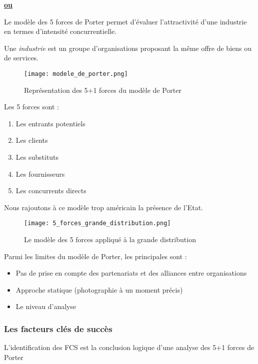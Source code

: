    \underline{{\textbf{ou}}}
   
   Le modèle des 5 forces de Porter permet d'évaluer l'attractivité d'une industrie en termes d'intensité concurrentielle.
   
   Une \textit{industrie} est un groupe d'organisations proposant la même offre de biens ou de services.
   
   \begin{figure}[H]
      \begin{center}
	\texttt{[image: modele\_de\_porter.png]}
	\caption{Représentation des 5+1 forces du modèle de Porter}
      \end{center}
   \end{figure}
   
   Les 5 forces sont :
   
   \begin{enumerate}
    \item Les entrants potentiels
    \item Les clients
    \item Les substituts
    \item Les fournisseurs
    \item Les concurrents directs
   \end{enumerate}
   
   Nous rajoutons à ce modèle trop américain la présence de l'Etat.
   
   \begin{figure}[H]
      \begin{center}
	\texttt{[image: 5\_forces\_grande\_distribution.png]}
	\caption{Le modèle des 5 forces appliqué à la grande distribution}
      \end{center}
   \end{figure}
   
   Parmi les limites du modèle de Porter, les principales sont :
   
   \begin{itemize}
    \item Pas de prise en compte des partenariats et des alliances entre organisations
    \item Approche statique (photographie à un moment précis)
    \item Le niveau d'analyse
   \end{itemize}
   
   \subsubsection{Les facteurs clés de succès}
      L'identification des FCS est la conclusion logique d'une analyse des 5+1 forces de Porter
      
